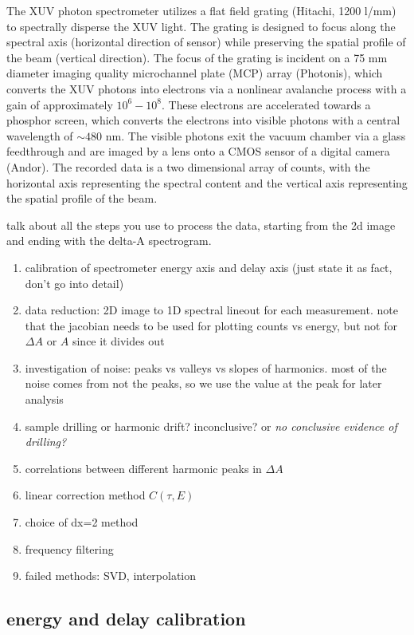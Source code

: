 The XUV photon spectrometer utilizes a flat field grating (Hitachi, 1200 l/mm) to spectrally disperse the XUV light. The grating is designed to focus along the spectral axis (horizontal direction of sensor) while preserving the spatial profile of the beam (vertical direction). The focus of the grating is incident on a 75 mm diameter imaging quality microchannel plate (MCP) array (Photonis), which converts the XUV photons into electrons via a nonlinear avalanche process with a gain of approximately $10^6 - 10^8$. These electrons are accelerated towards a phosphor screen, which converts the electrons into visible photons with a central wavelength of $\sim480$ nm. The visible photons exit the vacuum chamber via a glass feedthrough and are imaged by a lens onto a CMOS sensor of a digital camera (Andor). The recorded data is a two dimensional array of counts, with the horizontal axis representing the spectral content and the vertical axis representing the spatial profile of the beam.

talk about all the steps you use to process the data, starting from the 2d image and ending with the delta-A spectrogram.

\begin{enumerate}
	\item calibration of spectrometer energy axis and delay axis (just state it as fact, don't go into detail)
	\item data reduction: 2D image to 1D spectral lineout for each measurement. note that the jacobian needs to be used for plotting counts vs energy, but not for $\Delta A$ or $A$ since it divides out
	\item investigation of noise: peaks vs valleys vs slopes of harmonics. most of the noise comes from not the peaks, so we use the value at the peak for later analysis
	\item sample drilling or harmonic drift? inconclusive? or \textit{no conclusive evidence of drilling?}
	\item correlations between different harmonic peaks in $\Delta A$
	\item linear correction method $C(\tau,E)$
	\item choice of dx=2 method
	\item frequency filtering
	\item failed methods: SVD, interpolation
\end{enumerate}

\subsection{energy and delay calibration}
